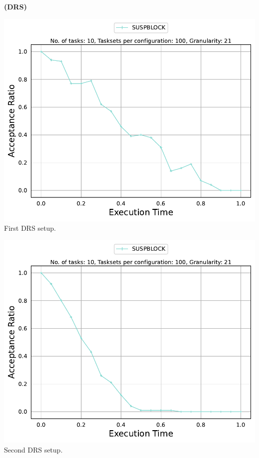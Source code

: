\documentclass[]{article}
\begin{document}
	\begin{minipage}[t]{0.48\linewidth}
		\centering
		\textbf{(DRS)}
		\vspace{0.3cm}
		
		\includegraphics[width=\linewidth]{SUSPBLOCK_1stSetup_DRS.pdf}
		First DRS setup.
		\vspace{0.3cm}
		
		\includegraphics[width=\linewidth]{SUSPBLOCK_2ndSetup_DRS.pdf}
		Second DRS setup.
		\vspace{0.3cm}
		

\end{minipage}
\end{document}
